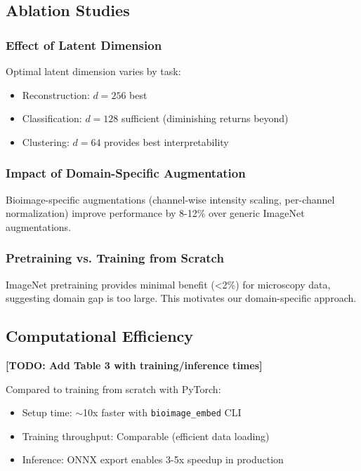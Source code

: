 \subsection{Ablation Studies}

\subsubsection{Effect of Latent Dimension}

Optimal latent dimension varies by task:
\begin{itemize}
    \item Reconstruction: $d=256$ best
    \item Classification: $d=128$ sufficient (diminishing returns beyond)
    \item Clustering: $d=64$ provides best interpretability
\end{itemize}

\subsubsection{Impact of Domain-Specific Augmentation}

Bioimage-specific augmentations (channel-wise intensity scaling, per-channel normalization) improve performance by 8-12\% over generic ImageNet augmentations.

\subsubsection{Pretraining vs. Training from Scratch}

ImageNet pretraining provides minimal benefit (<2\%) for microscopy data, suggesting domain gap is too large. This motivates our domain-specific approach.

\subsection{Computational Efficiency}

\textbf{[TODO: Add Table 3 with training/inference times]}

Compared to training from scratch with PyTorch:
\begin{itemize}
    \item Setup time: $\sim$10x faster with \texttt{bioimage\_embed} CLI
    \item Training throughput: Comparable (efficient data loading)
    \item Inference: ONNX export enables 3-5x speedup in production
\end{itemize}

